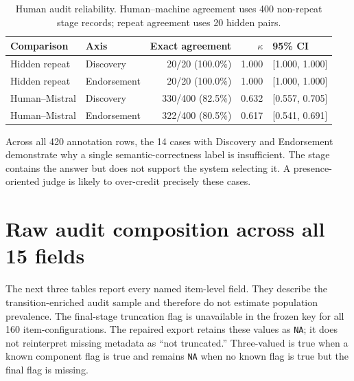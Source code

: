 \begin{table}[htbp]
  \centering
  \caption[Human audit reliability]{Human audit reliability. Human--machine agreement uses 400 non-repeat stage records; repeat agreement uses 20 hidden pairs.}
  \label{tab:agreement}
  \begin{tabular}{@{}llrrl@{}}
    \toprule
    Comparison & Axis & Exact agreement & $\kappa$ & 95\% CI \\
    \midrule
    Hidden repeat & Discovery & 20/20 (100.0\%) & 1.000 & [1.000, 1.000] \\
    Hidden repeat & Endorsement & 20/20 (100.0\%) & 1.000 & [1.000, 1.000] \\
    Human--Mistral & Discovery & 330/400 (82.5\%) & 0.632 & [0.557, 0.705] \\
    Human--Mistral & Endorsement & 322/400 (80.5\%) & 0.617 & [0.541, 0.691] \\
    \bottomrule
  \end{tabular}
\end{table}

Across all 420 annotation rows, the 14 cases with Discovery \correct{} and Endorsement \wrong{} demonstrate why a single semantic-correctness label is insufficient. The stage contains the answer but does not support the system selecting it. A presence-oriented judge is likely to over-credit precisely these cases.

\section{Raw audit composition across all 15 fields}

The next three tables report every named item-level field. They describe the transition-enriched audit sample and therefore do not estimate population prevalence. The final-stage truncation flag is unavailable in the frozen key for all 160 item-configurations. The repaired export retains these values as \texttt{NA}; it does not reinterpret missing metadata as ``not truncated.'' Three-valued  is true when a known component flag is true and remains \texttt{NA} when no known flag is true but the final flag is missing.

